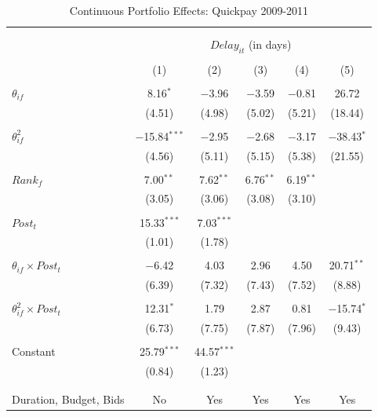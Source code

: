 \documentclass[
]{article}
\begin{document}
\begin{table}[H] \centering 
  \caption{Continuous Portfolio Effects: Quickpay 2009-2011} 
  \label{} 
\small 
\begin{tabular}{@{\extracolsep{-2pt}}lccccc} 
\\[-1.8ex]\hline 
\hline \\[-1.8ex] 
\\[-1.8ex] & \multicolumn{5}{c}{$Delay_{it}$ (in days)} \\ 
\\[-1.8ex] & (1) & (2) & (3) & (4) & (5)\\ 
\hline \\[-1.8ex] 
 $\theta_{if}$ & 8.16$^{*}$ & $-$3.96 & $-$3.59 & $-$0.81 & 26.72 \\ 
  & (4.51) & (4.98) & (5.02) & (5.21) & (18.44) \\ 
  & & & & & \\ 
 $\theta_{if}^2$ & $-$15.84$^{***}$ & $-$2.95 & $-$2.68 & $-$3.17 & $-$38.43$^{*}$ \\ 
  & (4.56) & (5.11) & (5.15) & (5.38) & (21.55) \\ 
  & & & & & \\ 
 $Rank_f$ & 7.00$^{**}$ & 7.62$^{**}$ & 6.76$^{**}$ & 6.19$^{**}$ &  \\ 
  & (3.05) & (3.06) & (3.08) & (3.10) &  \\ 
  & & & & & \\ 
 $Post_t$ & 15.33$^{***}$ & 7.03$^{***}$ &  &  &  \\ 
  & (1.01) & (1.78) &  &  &  \\ 
  & & & & & \\ 
 $\theta_{if} \times Post_t$ & $-$6.42 & 4.03 & 2.96 & 4.50 & 20.71$^{**}$ \\ 
  & (6.39) & (7.32) & (7.43) & (7.52) & (8.88) \\ 
  & & & & & \\ 
 $\theta_{if}^2 \times Post_t$ & 12.31$^{*}$ & 1.79 & 2.87 & 0.81 & $-$15.74$^{*}$ \\ 
  & (6.73) & (7.75) & (7.87) & (7.96) & (9.43) \\ 
  & & & & & \\ 
 Constant & 25.79$^{***}$ & 44.57$^{***}$ &  &  &  \\ 
  & (0.84) & (1.23) &  &  &  \\ 
  & & & & & \\ 
\hline \\[-1.8ex] 
Duration, Budget, Bids & No & Yes & Yes & Yes & Yes \\ 

\end{tabular}
\end{table}
\end{document}
